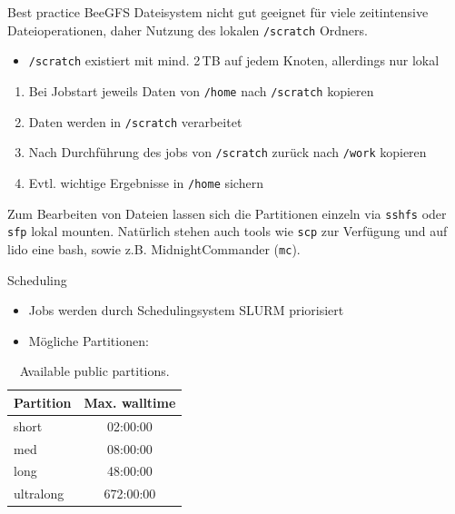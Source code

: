 \begin{frame}{Best practice}
  BeeGFS Dateisystem nicht gut geeignet für viele zeitintensive Dateioperationen, daher Nutzung des lokalen \texttt{/scratch} Ordners.
  \begin{itemize}
    \item \texttt{/scratch} existiert mit mind. 2\,TB auf jedem Knoten, allerdings nur lokal
  \end{itemize}
  \begin{enumerate}
    \item Bei Jobstart jeweils Daten von \texttt{/home} nach \texttt{/scratch} kopieren
    \item Daten werden in \texttt{/scratch} verarbeitet
    \item Nach Durchführung des jobs von \texttt{/scratch} zurück nach \texttt{/work} kopieren
    \item Evtl. wichtige Ergebnisse in \texttt{/home} sichern
  \end{enumerate}
  Zum Bearbeiten von Dateien lassen sich die Partitionen einzeln via \texttt{sshfs} oder \texttt{sfp} lokal mounten. Natürlich stehen auch tools wie \texttt{scp} zur Verfügung und auf lido eine bash, sowie z.B. MidnightCommander (\texttt{mc}).

\end{frame}

\begin{frame}{Scheduling}
  \begin{itemize}
    \item Jobs werden durch Schedulingsystem SLURM priorisiert
    \item Mögliche Partitionen:
  \end{itemize}
  \begin{table}
    \begin{tabular}{l
                    c
                    }
            \toprule
            Partition & Max. walltime \\
            \midrule
            short & 02:00:00 \\
            med & 08:00:00 \\
            long & 48:00:00 \\
            ultralong & 672:00:00 \\
            \bottomrule
    \end{tabular}
    \caption{Available public partitions.}
    \label{tab:part}
  \end{table}
\end{frame}

